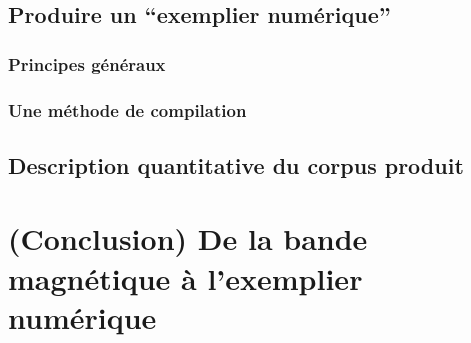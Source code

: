 


\subsection{Produire un \enquote{exemplier numérique}}

\subsubsection{Principes généraux}




\subsubsection{Une méthode de compilation}


\subsection{Description quantitative du corpus produit}


\section*{(Conclusion) De la bande magnétique à l'exemplier numérique}

